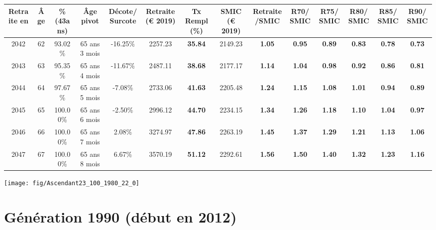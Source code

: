 \begin{adjustbox}{max width=\textwidth} 
\begin{tabular}[htb]{|c|c||c|c|c||c|c||c|c||c|c|c|c|c|} 
\hline 
 Retraite en &  Âge &  \%(43ans) &  Âge pivot &  Décote/Surcote &  Retraite (\euro{} 2019) &  Tx Rempl(\%) &  SMIC (\euro{} 2019) &  Retraite/SMIC &  R70/SMIC &  R75/SMIC &  R80/SMIC &  R85/SMIC &  R90/SMIC \\ 
\hline \hline 
 2042 &  62 &  93.02\% &  65 ans 3 mois &  -16.25\% &  2257.23 &  {\bf 35.84} &  2149.23 &  {\bf 1.05} &  {\bf {\color{red} 0.95}} &  {\bf {\color{red} 0.89}} &  {\bf {\color{red} 0.83}} &  {\bf {\color{red} 0.78}} &  {\bf {\color{red} 0.73}} \\ 
\hline 
 2043 &  63 &  95.35\% &  65 ans 4 mois &  -11.67\% &  2487.11 &  {\bf 38.68} &  2177.17 &  {\bf 1.14} &  {\bf 1.04} &  {\bf {\color{red} 0.98}} &  {\bf {\color{red} 0.92}} &  {\bf {\color{red} 0.86}} &  {\bf {\color{red} 0.81}} \\ 
\hline 
 2044 &  64 &  97.67\% &  65 ans 5 mois &  -7.08\% &  2733.06 &  {\bf 41.63} &  2205.48 &  {\bf 1.24} &  {\bf 1.15} &  {\bf 1.08} &  {\bf 1.01} &  {\bf {\color{red} 0.94}} &  {\bf {\color{red} 0.89}} \\ 
\hline 
 2045 &  65 &  100.00\% &  65 ans 6 mois &  -2.50\% &  2996.12 &  {\bf 44.70} &  2234.15 &  {\bf 1.34} &  {\bf 1.26} &  {\bf 1.18} &  {\bf 1.10} &  {\bf 1.04} &  {\bf {\color{red} 0.97}} \\ 
\hline 
 2046 &  66 &  100.00\% &  65 ans 7 mois &  2.08\% &  3274.97 &  {\bf 47.86} &  2263.19 &  {\bf 1.45} &  {\bf 1.37} &  {\bf 1.29} &  {\bf 1.21} &  {\bf 1.13} &  {\bf 1.06} \\ 
\hline 
 2047 &  67 &  100.00\% &  65 ans 8 mois &  6.67\% &  3570.19 &  {\bf 51.12} &  2292.61 &  {\bf 1.56} &  {\bf 1.50} &  {\bf 1.40} &  {\bf 1.32} &  {\bf 1.23} &  {\bf 1.16} \\ 
\hline 
\hline 
\end{tabular} 
\end{adjustbox} 
 
 \vspace{0.1cm} 

 {\hspace{-2.2cm}\texttt{[image: fig/Ascendant23\_100\_1980\_22\_0]}} 

\newpage 
 
\section{Génération 1990 (début en 2012)\label{Ascendant23_100_1990_22_0}} 
 

